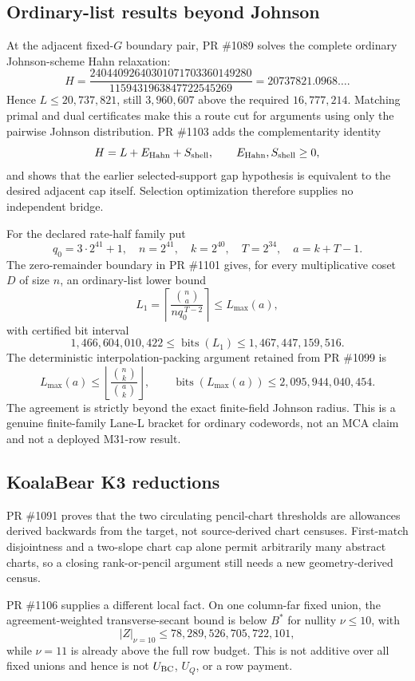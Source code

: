 \documentclass[11pt]{article}
\begin{document}
\subsection{Ordinary-list results beyond Johnson}

At the adjacent fixed-\(G\) boundary pair, PR \#1089 solves the complete
ordinary Johnson-scheme Hahn relaxation:
\[
 H=
 \frac{24044092640301071703360149280}
      {1159431963847722545269}
 =20737821.0968\ldots .
\]
Hence \(L\le20{,}737{,}821\), still \(3{,}960{,}607\) above the required
\(16{,}777{,}214\).  Matching primal and dual certificates make this a route
cut for arguments using only the pairwise Johnson distribution.  PR \#1103
adds the complementarity identity
\[
 H=L+E_{\rm Hahn}+S_{\rm shell},
 \qquad E_{\rm Hahn},S_{\rm shell}\ge0,
\]
and shows that the earlier selected-support gap hypothesis is equivalent to
the desired adjacent cap itself.  Selection optimization therefore supplies
no independent bridge.

For the declared rate-half family put
\[
 q_0=3\cdot2^{41}+1,\quad n=2^{41},\quad k=2^{40},
 \quad T=2^{34},\quad a=k+T-1.
\]
The zero-remainder boundary in PR \#1101 gives, for every multiplicative coset
\(D\) of size \(n\), an ordinary-list lower bound
\[
 L_1=
 \left\lceil
   \frac{\binom{n}{a}}{nq_0^{\,T-2}}
 \right\rceil
 \le L_{\max}(a),
\]
with certified bit interval
\[
 1{,}466{,}604{,}010{,}422
 \le \operatorname{bits}(L_1)
 \le1{,}467{,}447{,}159{,}516.
\]
The deterministic interpolation-packing argument retained from PR \#1099 is
\[
 L_{\max}(a)
 \le
 \left\lfloor
   \frac{\binom{n}{k}}{\binom{a}{k}}
 \right\rfloor,
 \qquad
 \operatorname{bits}(L_{\max}(a))
 \le2{,}095{,}944{,}040{,}454.
\]
The agreement is strictly beyond the exact finite-field Johnson radius.  This
is a genuine finite-family Lane-L bracket for ordinary codewords, not an MCA
claim and not a deployed M31-row result.

\subsection{KoalaBear K3 reductions}

PR \#1091 proves that the two circulating pencil-chart thresholds are
allowances derived backwards from the target, not source-derived chart
censuses.  First-match disjointness and a two-slope chart cap alone permit
arbitrarily many abstract charts, so a closing rank-or-pencil argument still
needs a new geometry-derived census.

PR \#1106 supplies a different local fact.  On one column-far fixed union, the
agreement-weighted transverse-secant bound is below \(B^*\) for nullity
\(\nu\le10\), with
\[
  |Z|_{\nu=10}\le78{,}289{,}526{,}705{,}722{,}101,
\]
while \(\nu=11\) is already above the full row budget.  This is not additive
over all fixed unions and hence is not \(U_{\rm BC}\), \(U_Q\), or a row
payment.
\end{document}
